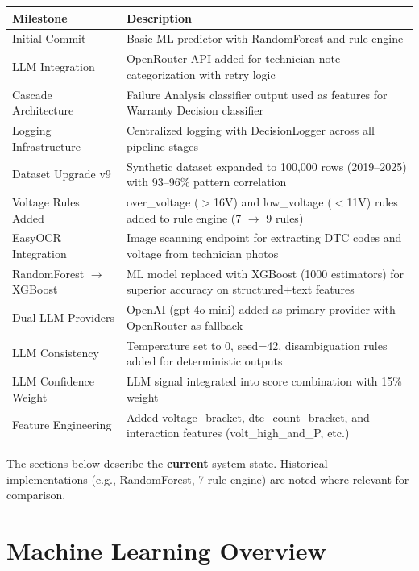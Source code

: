 \documentclass[10pt]{article}
\begin{document}
\begin{table}[h!]
\centering
\begin{tabular}{|p{2.5cm}|p{10cm}|}
\hline
\textbf{Milestone} & \textbf{Description} \\ \hline
Initial Commit & Basic ML predictor with RandomForest and rule engine \\ \hline
LLM Integration & OpenRouter API added for technician note categorization with retry logic \\ \hline
Cascade Architecture & Failure Analysis classifier output used as features for Warranty Decision classifier \\ \hline
Logging Infrastructure & Centralized logging with DecisionLogger across all pipeline stages \\ \hline
Dataset Upgrade v9 & Synthetic dataset expanded to 100{,}000 rows (2019--2025) with 93--96\% pattern correlation \\ \hline
Voltage Rules Added & over\_voltage ($>$16V) and low\_voltage ($<$11V) rules added to rule engine (7 $\rightarrow$ 9 rules) \\ \hline
EasyOCR Integration & Image scanning endpoint for extracting DTC codes and voltage from technician photos \\ \hline
RandomForest $\rightarrow$ XGBoost & ML model replaced with XGBoost (1000 estimators) for superior accuracy on structured+text features \\ \hline
Dual LLM Providers & OpenAI (gpt-4o-mini) added as primary provider with OpenRouter as fallback \\ \hline
LLM Consistency & Temperature set to 0, seed=42, disambiguation rules added for deterministic outputs \\ \hline
LLM Confidence Weight & LLM signal integrated into score combination with 15\% weight \\ \hline
Feature Engineering & Added voltage\_bracket, dtc\_count\_bracket, and interaction features (volt\_high\_and\_P, etc.) \\ \hline
\end{tabular}
\end{table}

The sections below describe the \textbf{current} system state. Historical implementations (e.g., RandomForest, 7-rule engine) are noted where relevant for comparison.

\section{Machine Learning Overview}
\end{document}
